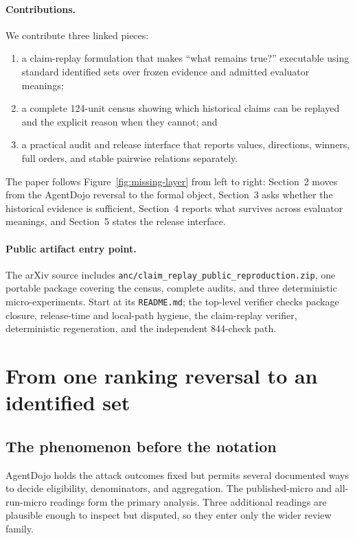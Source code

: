 \documentclass{article}
\begin{document}
\paragraph{Contributions.}
We contribute three linked pieces:
\begin{enumerate}[leftmargin=*,label=(\roman*),itemsep=.15ex,topsep=.25ex]
  \item a claim-replay formulation that makes ``what remains true?'' executable using standard identified sets over frozen evidence and admitted evaluator meanings;
  \item a complete 124-unit census showing which historical claims can be replayed and the explicit reason when they cannot; and
  \item a practical audit and release interface that reports values, directions, winners, full orders, and stable pairwise relations separately.
\end{enumerate}
The paper follows Figure~\ref{fig:missing-layer} from left to right: Section~2 moves from the AgentDojo reversal to the formal object, Section~3 asks whether the historical evidence is sufficient, Section~4 reports what survives across evaluator meanings, and Section~5 states the release interface.

\paragraph{Public artifact entry point.}
{\raggedright The arXiv source includes \texttt{anc/claim\_replay\_public\_reproduction.zip}, one portable package covering the census, complete audits, and three deterministic micro-experiments.  Start at its \texttt{README.md}; the top-level verifier checks package closure, release-time and local-path hygiene, the claim-replay verifier, deterministic regeneration, and the independent 844-check path.\par}

\section{From one ranking reversal to an identified set}
\label{sec:formal-layer}

\subsection{The phenomenon before the notation}

AgentDojo holds the attack outcomes fixed but permits several documented ways to decide eligibility, denominators, and aggregation.  The published-micro and all-run-micro readings form the primary analysis.  Three additional readings are plausible enough to inspect but disputed, so they enter only the wider review family.
\end{document}

